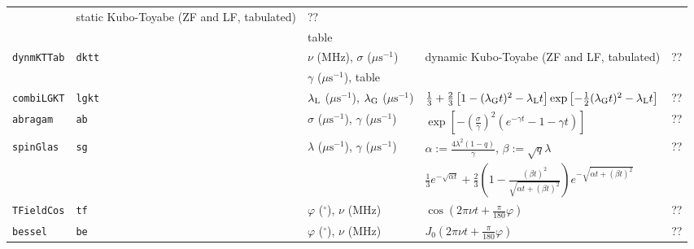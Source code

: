 \documentclass[twoside]{article}
\begin{document}
\begin{table}[h]
\begin{tabular}{|l|l|l|l|l|}
        & static Kubo-Toyabe (ZF and LF, tabulated) & ?? \\
                      &               & table & & \\ \hline
   \rule[-3mm]{0mm}{8mm}
   \texttt{dynmKTTab} & \texttt{dktt} & $\nu$ (MHz), $\sigma$ ($\mu\mathrm{s}^{-1}$) 
        & dynamic Kubo-Toyabe (ZF and LF, tabulated) & ?? \\
                      &               & $\gamma$ ($\mu\mathrm{s}^{-1}$), table & & \\ \hline
   \rule[-3mm]{0mm}{8mm}
   \texttt{combiLGKT} & \texttt{lgkt} & $\lambda_{\rm L}$ ($\mu\mathrm{s}^{-1}$),
        $\lambda_{\rm G}$ ($\mu\mathrm{s}^{-1}$) &
        $\frac{1}{3}+\frac{2}{3}\left[1-(\lambda_{\rm G}t)^2-\lambda_{\rm L}t
            \right]\exp\left[-\frac{1}{2}(\lambda_{\rm G}t)^2-\lambda_{\rm L}t\right]$ 
        & ?? \\ \hline
   \rule[-3mm]{0mm}{8mm}
   \texttt{abragam} & \texttt{ab} & $\sigma$ ($\mu\mathrm{s}^{-1}$),
        $\gamma$ ($\mu\mathrm{s}^{-1}$) & 
        $\exp\left[-\left(\frac{\displaystyle\sigma}{\displaystyle\gamma}\right)^2 
             (e^{-\gamma t}-1-\gamma t)\right]$ & ?? \\ \hline
   \rule[-3mm]{0mm}{8mm}
   \texttt{spinGlas} & \texttt{sg} & $\lambda$ ($\mu\mathrm{s}^{-1}$), 
        $\gamma$ ($\mu\mathrm{s}^{-1}$) & $\alpha := \frac{4\lambda^2 (1-q)}{\gamma}$,
        \qquad $\beta := \sqrt{q} \lambda$ & ?? \\
   \rule[-3mm]{0mm}{8mm}
        & & & $\frac{1}{3} e^{-\sqrt{\alpha t}} + \frac{2}{3} \left( 1 -
              \frac{(\beta t)^2}{\sqrt{\alpha t + (\beta t)^2}} \right)
              e^{-\sqrt{\alpha t + (\beta t)^2}} $ & \\ \hline
   \rule[-3mm]{0mm}{8mm}
   \texttt{TFieldCos} & \texttt{tf} & $\varphi$ ($^\circ$), $\nu$ (MHz) 
        & $\cos(2\pi\nu t + \frac{\displaystyle \pi}{180} \varphi) $ & ?? \\ \hline
   \rule[-3mm]{0mm}{8mm}
   \texttt{bessel} & \texttt{be} & $\varphi$ ($^\circ$), $\nu$ (MHz)
        & $J_0(2\pi\nu t + \frac{\displaystyle \pi}{180} \varphi)$ & ?? \\ \hline

\end{tabular}
\end{table}
\end{document}
